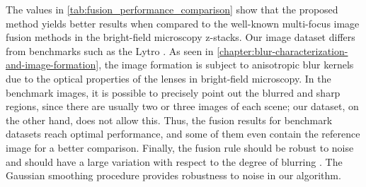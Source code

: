 The values in \autoref{tab:fusion_performance_comparison} show that the proposed method yields better results when compared to the well-known multi-focus image fusion methods in the bright-field microscopy z-stacks. Our image dataset differs from benchmarks such as the Lytro \cite{nejati2015multi}. As seen in \autoref{chapter:blur-characterization-and-image-formation}, the image formation is subject to anisotropic blur kernels due to the optical properties of the lenses in bright-field microscopy. In the benchmark images, it is possible to precisely point out the blurred and sharp regions, since there are usually two or three images of each scene; our dataset, on the other hand, does not allow this. Thus, the fusion results for benchmark datasets reach optimal performance, and some of them even contain the reference image for a better comparison. Finally, the fusion rule should be robust to noise and should have a large variation with respect to the degree of blurring \cite{huang2007evaluation}. The Gaussian smoothing procedure provides robustness to noise in our algorithm. 